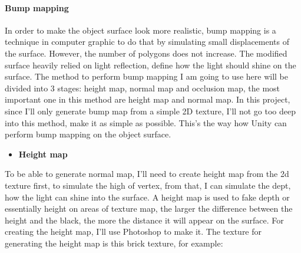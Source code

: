 \documentclass[a4paper, 13pt]{extarticle}
\begin{document}
	\paragraph{Bump mapping}
	In order to make the object surface look more realistic, bump mapping is a technique in computer graphic to do that by simulating small displacements of the surface. However, the number of polygons does not increase. The modified surface heavily relied on light reflection, define how the light should shine on the surface.
	The method to perform bump mapping I am going to use here will be divided into 3 stages: height map, normal map and occlusion map, the most important one in this method are height map and normal map. In this project, since I'll only generate bump map from a simple 2D texture, I'll not go too deep into this method, make it as simple as possible. This's the way how Unity can perform bump mapping on the object surface.
	\begin{itemize}
		\item \bfseries Height map	 	
	\end{itemize}
		To be able to generate normal map, I'll need to create height map from the 2d texture first, to simulate the high of vertex, from that, I can simulate the dept, how the light can shine into the surface. A height map is used to fake depth or essentially height on areas of texture map, the larger the difference between the height and the black, the more the distance it will appear on the surface. For creating the height map, I'll use Photoshop to make it. The texture for generating  the height map is this brick texture, for example: 
\end{document}
